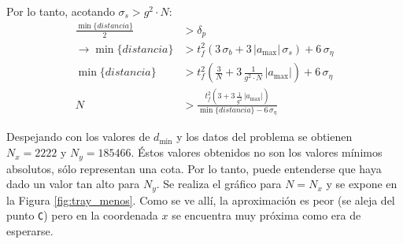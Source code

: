 	Por lo tanto, acotando $\sigma_s > g^2 \cdot N$:
	\begin{align*}
		\frac{\min\{distancia\}}{2} &> \delta_p\\
		\rightarrow \min\{distancia\} &> t^2_f (3\, \sigma_b + 3\,|a_{\max}|\,\sigma_s) + 6\, \sigma_{\eta}\\
		\min\{distancia\} &> t^2_f \left(\frac{3}{N} + 3\,\frac{1}{g^2\cdot N}\,|a_{\max}|\right)+ 6\, \sigma_{\eta}\\
		N &> \frac{{t^2_f} \left(3 + 3\,\frac{1}{g^2}\,|a_{\max}|\right)}{\min\{distancia\} - 6\, \sigma_{\eta}}
	\end{align*}
	
	Despejando con los valores de $d_{\min}$ y los datos del problema se obtienen $N_x=2222$ y $N_y=185466$. Éstos valores obtenidos no son los valores mínimos absolutos, sólo representan una cota. Por lo tanto, puede entenderse que haya dado un valor tan alto para $N_y$. 
	Se realiza el gráfico para $N=N_x$ y se expone en la Figura \ref{fig:tray_menos}. Como se ve allí, la aproximación es peor (se aleja del punto \texttt{C}) pero en la coordenada $x$ se encuentra muy próxima como era de esperarse.
